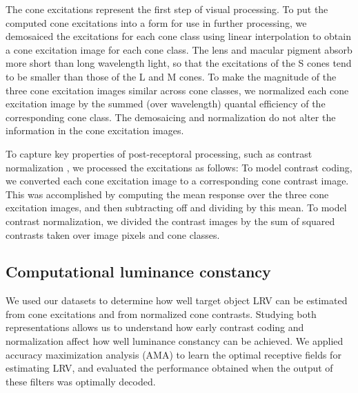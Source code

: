 \documentclass{jov}
\begin{document}
The cone excitations represent the first step of visual processing. %
To put the computed cone excitations into a form for use in further processing, we demosaiced the excitations for each cone class using linear interpolation
to obtain a cone excitation image for each cone class.
The lens and macular pigment absorb more short than long wavelength light, so that the excitations of the S cones tend to be
smaller than those of the L and M cones.
To make the magnitude of the three cone excitation images similar across cone classes, we
normalized each cone excitation image by the summed (over wavelength) quantal efficiency of the corresponding cone class.
The demosaicing and normalization do not alter the information in the cone excitation images. 

To capture key properties of post-receptoral processing, such as contrast normalization \cite{heeger1992normalization,albrecht1991motion,carandini2012normalization}, 
we processed the excitations as follows:
To model contrast coding, we converted each cone excitation image to a corresponding cone contrast image.
This was accomplished by computing the mean response over the three cone excitation images, and then subtracting off and dividing by this mean.
To model contrast normalization, we divided the contrast images by the sum of squared contrasts taken over image pixels and cone classes.


\subsection{Computational luminance constancy} \label{method:SupervisedLearning}
We used our datasets to determine how well target object LRV can be estimated from cone excitations and from normalized cone contrasts.
Studying both representations allows us to understand how early contrast coding and normalization affect how well luminance constancy can be achieved.
We applied accuracy maximization analysis (AMA) to learn the optimal receptive fields for estimating LRV,
and evaluated the performance obtained when the output of these filters was optimally decoded.
\end{document}
